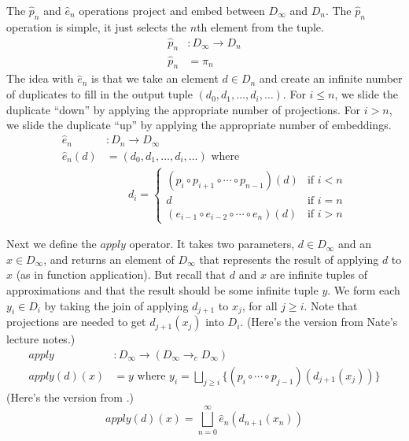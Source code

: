 \documentclass{tufte-handout}
\begin{document}
The $\hat{p}_n$ and $\hat{e}_n$ operations project and embed
between $D_\infty$ and $D_n$.  The $\hat{p}_n$ operation is simple, it
just selects the $n$th element from the tuple.
\begin{align*}
 \hat{p}_n &: D_\infty \to D_n \\
 \hat{p}_n &= \pi_n
\end{align*}
The idea with $\hat{e}_n$ is that we take an element $d \in
D_n$ and create an infinite number of duplicates to fill in the output
tuple $(d_0, d_1, \ldots, d_i, \ldots)$. For $i \leq n$, we slide the
duplicate ``down'' by applying the appropriate number of projections.
For $i > n$, we slide the duplicate ``up'' by applying the appropriate
number of embeddings.
\begin{align*}
 \hat{e}_n &: D_n \to D_\infty \\
 \hat{e}_n(d) &= (d_0, d_1, \ldots, d_i, \ldots) \text{ where} \\
  & \qquad d_i = 
  \begin{cases}
    (p_i \circ p_{i+1} \circ \cdots \circ p_{n-1})(d) & \text{if } i < n \\
    d & \text{if } i = n \\
    (e_{i-1} \circ e_{i-2} \circ \cdots \circ e_n)(d) & \text{if } i > n
  \end{cases}
\end{align*}


Next we define the $\mathit{apply}$ operator. It takes two parameters,
$d \in D_\infty$ and an $x\in D_\infty$, and returns an element of
$D_\infty$ that represents the result of applying $d$ to $x$ (as in
function application). But recall that $d$ and $x$ are infinite tuples
of approximations and that the result should be some infinite tuple
$y$. We form each $y_i \in D_i$ by taking the join of applying
$d_{j+1}$ to $x_j$, for all $j \geq i$. Note that projections are
needed to get $d_{j+1}(x_j)$ into $D_i$.
(Here's the version from Nate's lecture notes.)
\begin{align*}
 \mathit{apply} &: D_{\infty} \to (D_{\infty} \to_c D_{\infty}) \\
 \mathit{apply}(d)(x) &=  y 
   \text{ where } y_i = 
  \bigsqcup_{j\geq i} \{ (p_i\circ \cdots \circ p_{j-1}) (d_{j+1}(x_{j})) \}
\end{align*}
(Here's the version from \citet{Scott:1971aa}.)
\[
   \mathit{apply}(d)(x) =  \bigsqcup_{n=0}^{\infty} \hat{e}_n(d_{n+1}(x_n))
\]

\end{document}
